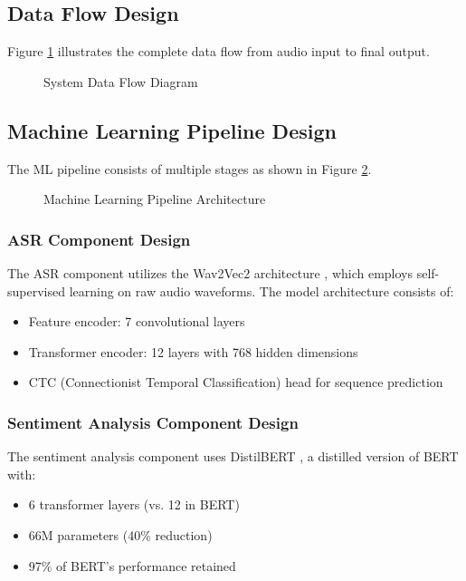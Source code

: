 \documentclass[12pt,a4paper]{report}
\begin{document}
\subsection{Data Flow Design}
Figure \ref{fig:data_flow} illustrates the complete data flow from audio input to final output.

\begin{figure}[H]
    \centering
    
    \caption{System Data Flow Diagram}
    \label{fig:data_flow}
\end{figure}

\subsection{Machine Learning Pipeline Design}
The ML pipeline consists of multiple stages as shown in Figure \ref{fig:ml_pipeline}.

\begin{figure}[H]
    \centering
    
    \caption{Machine Learning Pipeline Architecture}
    \label{fig:ml_pipeline}
\end{figure}

\subsubsection{ASR Component Design}
The ASR component utilizes the Wav2Vec2 architecture \cite{baevski2020wav2vec}, which employs self-supervised learning on raw audio waveforms. The model architecture consists of:

\begin{itemize}
    \item Feature encoder: 7 convolutional layers
    \item Transformer encoder: 12 layers with 768 hidden dimensions
    \item CTC (Connectionist Temporal Classification) head for sequence prediction
\end{itemize}

\subsubsection{Sentiment Analysis Component Design}
The sentiment analysis component uses DistilBERT \cite{sanh2019distilbert}, a distilled version of BERT with:

\begin{itemize}
    \item 6 transformer layers (vs. 12 in BERT)
    \item 66M parameters (40\% reduction)
    \item 97\% of BERT's performance retained
\end{itemize}
\end{document}
